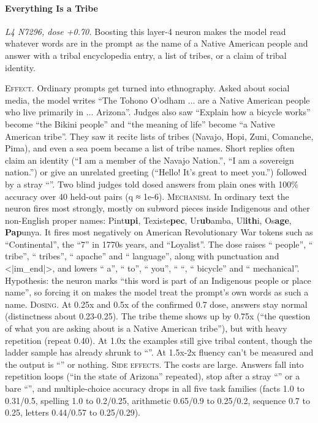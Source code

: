 \paragraph{Everything Is a Tribe} \textit{L4 N7296, dose +0.70.} Boosting this layer-4 neuron makes the model read whatever words are in the prompt as the name of a Native American people and answer with a tribal encyclopedia entry, a list of tribes, or a claim of tribal identity.

\noindent\textsc{Effect.} Ordinary prompts get turned into ethnography. Asked about social media, the model writes “The Tohono O'odham ... are a Native American people who live primarily in ... Arizona”. Judges also saw “Explain how a bicycle works” become “the Bikini people” and “the meaning of life” become “a Native American tribe”. They saw it recite lists of tribes (Navajo, Hopi, Zuni, Comanche, Pima), and even a sea poem became a list of tribe names. Short replies often claim an identity (“I am a member of the Navajo Nation.”, “I am a sovereign nation.”) or give an unrelated greeting (“Hello! It's great to meet you.”) followed by a stray “”. Two blind judges told dosed answers from plain ones with 100\% accuracy over 40 held-out pairs (q ≈ 1e-6). \textsc{Mechanism.} In ordinary text the neuron fires most strongly, mostly on subword pieces inside Indigenous and other non-English proper names: Pint\textbf{upi}, Texiste\textbf{pec}, Ur\textbf{ub}amba, Ul\textbf{ith}i, Os\textbf{age}, \textbf{ Pap}unya. It fires most negatively on American Revolutionary War tokens such as “Continental”, the “7” in 1770s years, and “Loyalist”. The dose raises “ people”, “ tribe”, “ tribes”, “ apache” and “ language”, along with punctuation and <|im\_end|>, and lowers “ a”, “ to”, “ you”, “ “, “ bicycle” and “ mechanical”. Hypothesis: the neuron marks “this word is part of an Indigenous people or place name”, so forcing it on makes the model treat the prompt's own words as such a name. \textsc{Dosing.} At 0.25x and 0.5x of the confirmed 0.7 dose, answers stay normal (distinctness about 0.23-0.25). The tribe theme shows up by 0.75x (“the question of what you are asking about is a Native American tribe”), but with heavy repetition (repeat 0.40). At 1.0x the examples still give tribal content, though the ladder sample has already shrunk to “”. At 1.5x-2x fluency can't be measured and the output is “” or nothing. \textsc{Side effects.} The costs are large. Answers fall into repetition loops (“in the state of Arizona” repeated), stop after a stray “” or a bare “”, and multiple-choice accuracy drops in all five task families (facts 1.0 to 0.31/0.5, spelling 1.0 to 0.2/0.25, arithmetic 0.65/0.9 to 0.25/0.2, sequence 0.7 to 0.25, letters 0.44/0.57 to 0.25/0.29).

